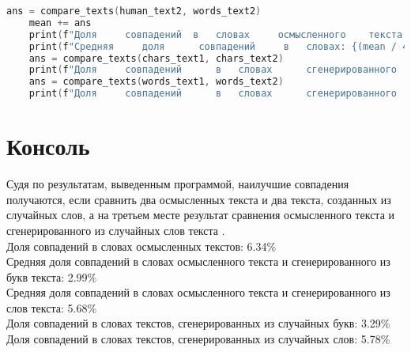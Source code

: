 \begin{lstlisting}[language=C]
    ans = compare_texts(human_text2, words_text2)
    mean += ans
    print(f"Доля	 совпадений	 в	 словах 	осмысленного 	текста	 №2	  и 	сгенерированного	 из	 слов	 текста	 №2: {ans * 100:.2f}\%")
    print(f"Средняя 	доля	  совпадений 	 в 	 словах: {(mean / 4) * 100:.2f}\%\n")
    ans = compare_texts(chars_text1, chars_text2)
    print(f"Доля 	 совпадений 	 в 	 словах 	 сгенерированного	  из 	 букв 		текста 		№1	 и 	сгенерированного 	из	 букв	 текста	 №2: {ans * 100:.2f}\%")
    ans = compare_texts(words_text1, words_text2)
    print(f"Доля 	 совпадений 	 в 	 словах 	 сгенерированного 	из 	слов	 текста	 №1	 и 	сгенерированного 	из	 слов	 текста 	№2: {ans * 100:.2f}\%")

\end{lstlisting}

\pagebreak


\section{Консоль}

Судя по результатам, выведенным программой, наилучшие совпадения получаются, если сравнить два осмысленных текста и два текста, созданных из случайных слов, а на третьем месте результат сравнения осмысленного текста и сгенерированного из случайных слов текста .\\

Доля совпадений в словах осмысленных текстов: 6.34\% \\
Средняя доля совпадений в словах осмысленного текста и сгенерированного из букв текста: 2.99\%\\
Средняя доля совпадений в словах осмысленного текста и сгенерированного из слов текста: 5.68\% \\
Доля совпадений в словах текстов, сгенерированных из случайных букв: 3.29\%\\
Доля совпадений в словах текстов, сгенерированных из случайных слов: 5.78\%\\

